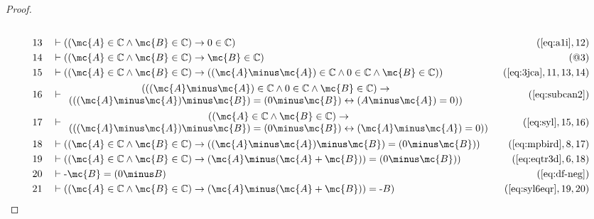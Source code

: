 \begin{proof}
\begin{align}
  \\ 13 &&  & \vdash ( ( \mc{A} \in \mathbb{C} \wedge \mc{B} \in \mathbb{C} ) \rightarrow
     0 \in \mathbb{C} )&(\mbox{\ref{eq:a1i}},12)\notag
  \\ 14 &&  & \vdash ( ( \mc{A} \in \mathbb{C} \wedge \mc{B} \in \mathbb{C} ) \rightarrow
     \mc{B} \in \mathbb{C} )&(@3)\notag
  \\ 15 &&  & \vdash ( ( \mc{A} \in \mathbb{C} \wedge \mc{B} \in \mathbb{C} ) \rightarrow
     ( ( \mc{A} \minus \mc{A} ) \in \mathbb{C} \wedge 0 \in
     \mathbb{C} \wedge \mc{B} \in \mathbb{C} )
     )&(\mbox{\ref{eq:3jca}},11,13,14)\notag
  \\ 16 &&  & \vdash 
     \begin{array}{c}
     ( ( ( \mc{A} \minus \mc{A} ) \in \mathbb{C} \wedge 0 \in \mathbb{C}
     \wedge \mc{B} \in \mathbb{C} ) \rightarrow \\
      ( ( ( \mc{A} \minus
     \mc{A} ) \minus \mc{B} ) = ( 0 \minus \mc{B} ) \leftrightarrow ( A
     \minus \mc{A} ) = 0 ) )
     \end{array}
     &(\mbox{\ref{eq:subcan2}})\notag
  \\ 17 &&  & \vdash 
     \begin{array}{c}
     ( ( \mc{A} \in \mathbb{C} \wedge \mc{B} \in \mathbb{C} ) \rightarrow \\
     ( ( ( \mc{A} \minus \mc{A} ) \minus \mc{B} ) = ( 0 \minus \mc{B} )
     \leftrightarrow ( \mc{A} \minus \mc{A} ) = 0 )
     )
     \end{array}
     &(\mbox{\ref{eq:syl}},15,16)\notag
  \\ 18 &&  & \vdash ( ( \mc{A} \in \mathbb{C} \wedge \mc{B} \in \mathbb{C} ) \rightarrow
     ( ( \mc{A} \minus \mc{A} ) \minus \mc{B} ) = ( 0 \minus \mc{B} )
     )&(\mbox{\ref{eq:mpbird}},8,17)\notag
  \\ 19 &&  & \vdash ( ( \mc{A} \in \mathbb{C} \wedge \mc{B} \in \mathbb{C} ) \rightarrow
     ( \mc{A} \minus ( \mc{A} + \mc{B} ) ) = ( 0 \minus \mc{B} )
     )&(\mbox{\ref{eq:eqtr3d}},6,18)\notag
  \\ 20 &&  & \vdash \textrm{-} \mc{B} = ( 0 \minus B
     )&(\mbox{\ref{eq:df-neg}})\notag
  \\ 21 &&  & \vdash ( ( \mc{A} \in \mathbb{C} \wedge \mc{B} \in \mathbb{C} ) \rightarrow
     ( \mc{A} \minus ( \mc{A} + \mc{B} ) ) = \textrm{-} B
     )&(\mbox{\ref{eq:syl6eqr}},19,20)\notag
\end{align}
\end{proof}


